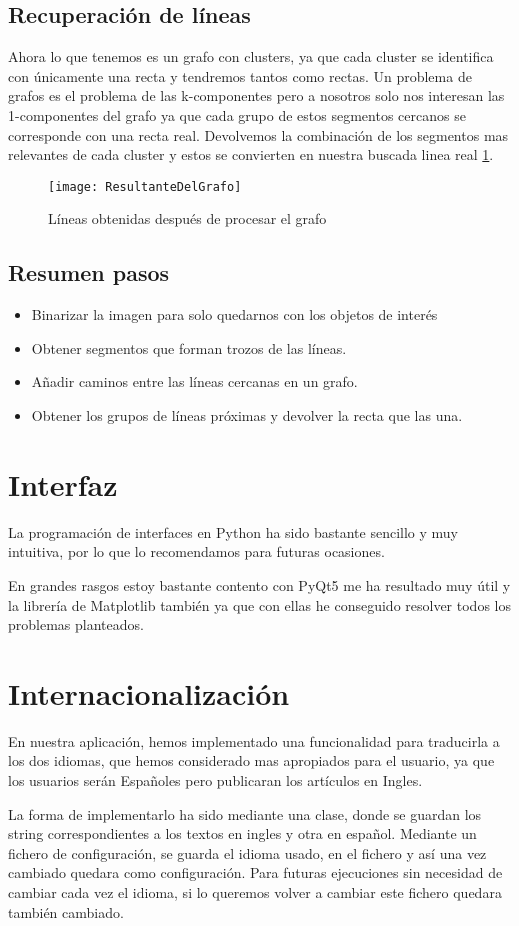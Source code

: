\subsection{Recuperación de líneas}
Ahora lo que tenemos es un grafo con clusters, ya que cada cluster se identifica con únicamente una recta y tendremos tantos como rectas.
Un problema de grafos es el problema de las k-componentes pero a nosotros solo nos interesan las 1-componentes del grafo ya que cada grupo de estos segmentos cercanos se corresponde con una recta real.
Devolvemos la combinación de los segmentos mas relevantes de cada cluster y estos se convierten en nuestra buscada linea real \ref{fig:5.7}.
\begin{figure}[h]
\centering
\texttt{[image: ResultanteDelGrafo]}
\caption{Líneas obtenidas después de procesar el grafo}
\label{fig:5.7}
\end{figure}

\subsection{Resumen pasos}

\begin{itemize}
\item Binarizar la imagen para solo quedarnos con los objetos de interés
\item Obtener segmentos que forman trozos de las líneas.
\item Añadir caminos entre las líneas cercanas en un grafo.
\item Obtener los grupos de líneas próximas y devolver la recta que las una. 
\end{itemize}

\section{Interfaz}
La programación de interfaces en Python ha sido bastante sencillo y muy intuitiva, por lo que lo recomendamos para futuras ocasiones.

En grandes rasgos estoy bastante contento con PyQt5 me ha resultado muy útil y la librería de Matplotlib también ya que con ellas he conseguido resolver todos los problemas planteados.

\section{Internacionalización}

En nuestra aplicación, hemos implementado una funcionalidad para traducirla a los dos idiomas, que hemos considerado mas apropiados para el usuario, ya que los usuarios serán Españoles pero publicaran los artículos en Ingles.

La forma de implementarlo ha sido mediante una clase, donde se guardan los string correspondientes a los textos en ingles y otra en español. Mediante un fichero de configuración, se guarda el idioma usado, en el fichero y así una vez cambiado quedara como configuración. Para futuras ejecuciones sin necesidad de cambiar cada vez el idioma, si lo queremos volver a cambiar este fichero quedara también cambiado.